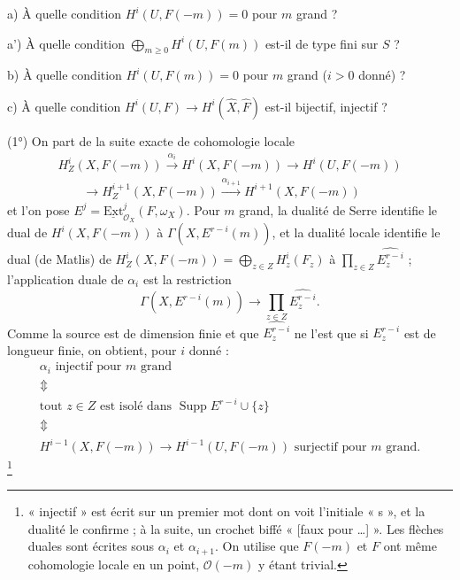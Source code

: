 \documentclass[11pt,a4paper]{article}
\begin{document}
a) À quelle condition $H^i(U, F(-m)) = 0$ pour $m$ grand ?

a') À quelle condition $\bigoplus_{m \geq 0} H^i(U, F(m))$ est-il de type fini
sur $S$ ?

b) À quelle condition $H^i(U, F(m)) = 0$ pour $m$ grand ($i > 0$ donné) ?

c) À quelle condition $H^i(U, F) \to H^i(\widehat{X}, \widehat{F})$ est-il
bijectif, injectif ?

(1°) On part de la suite exacte de cohomologie locale
\[
  \begin{array}{l}
  H^i_Z(X, F(-m)) \xrightarrow{\alpha_i} H^i(X, F(-m)) \to H^i(U, F(-m)) \\
  \qquad \to H^{i+1}_Z(X, F(-m)) \xrightarrow{\alpha_{i+1}} H^{i+1}(X, F(-m))
  \end{array}
\]
et l'on pose $E^j = \underline{\mathrm{Ext}}^j_{\mathcal{O}_X}(F, \omega_X)$.
Pour $m$ grand, la dualité de Serre identifie le dual de $H^i(X, F(-m))$ à
$\Gamma(X, E^{r-i}(m))$, et la dualité locale identifie le dual (de Matlis) de
$H^i_Z(X, F(-m)) = \bigoplus_{z \in Z} H^i_z(F_z)$ à
$\prod_{z \in Z} \widehat{E^{r-i}_z}$ ; l'application duale de $\alpha_i$ est
la restriction
\[
  \Gamma(X, E^{r-i}(m)) \longrightarrow \prod_{z \in Z} \widehat{E^{r-i}_z} .
\]
Comme la source est de dimension finie et que $\widehat{E^{r-i}_z}$ ne l'est
que si $E^{r-i}_z$ est de longueur finie, on obtient, pour $i$ donné :
\[
\begin{array}{l}
  \alpha_i \text{ injectif pour } m \text{ grand} \\
  \Updownarrow \\
  \text{tout } z \in Z \text{ est isolé dans } \operatorname{Supp} E^{r-i} \cup \lbrace z \rbrace \\
  \Updownarrow \\
  H^{i-1}(X, F(-m)) \to H^{i-1}(U, F(-m)) \text{ surjectif pour } m \text{ grand.}
\end{array}
\]
\footnote{« injectif » est écrit sur un premier mot dont on voit l'initiale
« s », et la dualité le confirme ; à la suite, un crochet biffé « [faux pour
…] ». Les flèches duales
sont écrites sous $\alpha_i$ et $\alpha_{i+1}$. On utilise que $F(-m)$ et $F$
ont même cohomologie locale en un point, $\mathcal{O}(-m)$ y étant trivial.}
\end{document}
